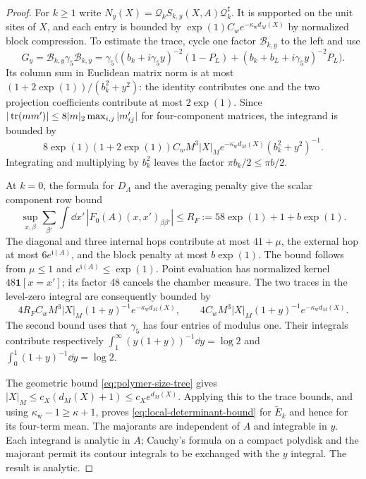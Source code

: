 \begin{proof}
For $k\ge1$ write
$N_y(X)=\mathcal Q_kS_{k,y}(X,A)\mathcal Q_k^\sharp$.
It is supported on the unit sites of $X$, and each entry is bounded
by $\exp(1)C_we^{-\kappa_{\mathrm w}d_M(X)}$ by normalized block
compression. To estimate the trace, cycle one factor
$\mathcal B_{k,y}$ to the left and use
\[
 G_y=\mathcal B_{k,y}\gamma_5\mathcal B_{k,y}
     =\gamma_5\bigl((b_k+i\gamma_5y)^{-2}(1-P_L)
              +(b_k+b_L+i\gamma_5y)^{-2}P_L\bigr).
\]
Its column sum in Euclidean matrix norm is at most
$(1+2\exp(1))/(b_k^2+y^2)$: the identity contributes one and the two
projection coefficients contribute at most $2\exp(1)$. Since
$|\operatorname{tr}(mm')|\le8|m|_2\max_{i,j}|m'_{ij}|$ for four-component
matrices, the integrand is bounded by
\begin{equation}\label{eq:polymer-determinant-trace-bound}
 8\exp(1)(1+2\exp(1))C_wM^3|X|_M
           e^{-\kappa_{\mathrm w}d_M(X)}(b_k^2+y^2)^{-1}.
\end{equation}
Integrating and multiplying by $b_k^2$ leaves the factor
$\pi b_k/2\le\pi b/2$.

At $k=0$, the formula for $D_A$ and the averaging penalty give
the scalar component row bound
\begin{equation}\label{eq:first-step-Dirac-row-bound}
 \sup_{x,\beta}\sum_{\beta'}\int\dd x'\,
                    |F_0(A)(x,x')_{\beta\beta'}|
                      \le R_F:=58\exp(1)+1+b\exp(1).
\end{equation}
The diagonal and three internal hops contribute
at most $41+\mu$, the external hop at most
$6e^{\mathfrak i(A)}$, and the block penalty at most $b\exp(1)$.
The bound follows from $\mu\le1$ and
$e^{\mathfrak i(A)}\le \exp(1)$. Point evaluation has normalized
kernel $48\mathbf1[x=x']$; its factor $48$ cancels the chamber
measure. The two traces in the level-zero integral are consequently
bounded by
\[
 4R_FC_wM^3|X|_M(1+y)^{-1}e^{-\kappa_{\mathrm w}d_M(X)},
 \qquad
 4C_wM^3|X|_M(1+y)^{-1}e^{-\kappa_{\mathrm w}d_M(X)}.
\]
The second bound uses that $\gamma_5$ has four entries of modulus
one. Their integrals contribute respectively
$\int_1^\infty(y(1+y))^{-1}\dd y=\log2$ and
$\int_0^1(1+y)^{-1}\dd y=\log2$.

The geometric bound \eqref{eq:polymer-size-tree} gives
$|X|_M\le c_X(d_M(X)+1)\le c_Xe^{d_M(X)}$.
Applying this to the trace bounds,
and using $\kappa_{\mathrm w}-1\ge\kappa+1$, proves
\eqref{eq:local-determinant-bound} for $\widetilde E_k$ and hence
for its four-term mean. The majorants are independent of $A$ and
integrable in $y$. Each integrand is analytic in $A$; Cauchy's
formula on a compact polydisk and the majorant permit its contour
integrals to be exchanged with the $y$ integral. The result is
analytic.


\end{proof}
